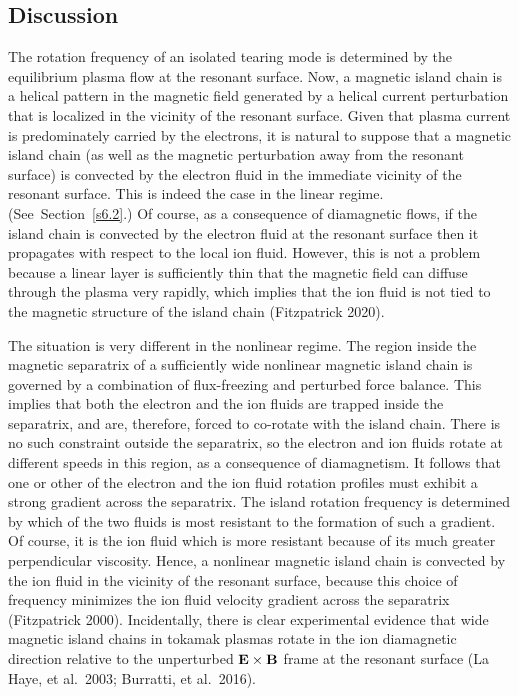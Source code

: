 \documentclass[notitlepage,12pt]{article}
\begin{document}
\subsection{Discussion}
The rotation frequency of an isolated tearing mode is determined by the
equilibrium plasma flow at the resonant surface. Now, a magnetic
island chain is a helical pattern in the magnetic field generated by a
helical current perturbation that is localized in the vicinity of the resonant surface. Given that plasma current is predominately carried by
the electrons, it is natural to suppose that a magnetic island chain (as
well as the magnetic perturbation away from the resonant surface)
is convected by the electron fluid in the immediate vicinity of the resonant surface. This is indeed the case in the linear regime. 
(See~Section~\ref{s6.2}.) Of course, as a consequence of diamagnetic flows, if the island chain is convected by the electron fluid at the resonant surface then it propagates with respect to the local ion fluid. However, this is not a problem because a linear layer is sufficiently thin that the magnetic field can diffuse through the plasma very rapidly, which implies that the ion fluid is not tied to the magnetic structure of the island chain (Fitzpatrick 2020).

The situation is very different in the nonlinear regime. The region
inside the magnetic separatrix of a sufficiently wide nonlinear magnetic island chain is
governed by a combination of flux-freezing and perturbed force balance. This implies that both the electron and the ion fluids are trapped
inside the separatrix, and are, therefore, forced to co-rotate with the
island chain. There is no such constraint outside the separatrix, so the
electron and ion fluids rotate at different speeds in this region, as a
consequence of diamagnetism. It follows that one or other of the electron and the ion fluid rotation profiles must exhibit a strong gradient
across the separatrix. The island rotation frequency is determined by
which of the two fluids is most resistant to the formation of such a gradient. Of course, it is the ion fluid which is more resistant because of
its much greater perpendicular viscosity. Hence, a nonlinear magnetic island chain is convected by the ion fluid in the vicinity of the resonant surface, because this choice of frequency minimizes the ion fluid velocity gradient across the separatrix (Fitzpatrick 2000). Incidentally, there is clear experimental evidence that wide magnetic island chains in tokamak plasmas rotate in the ion
diamagnetic direction relative to the unperturbed ${\bf E}\times {\bf B}$ frame at the resonant surface (La Haye, et al.\ 2003;
Burratti, et al.\ 2016). 
\end{document}
